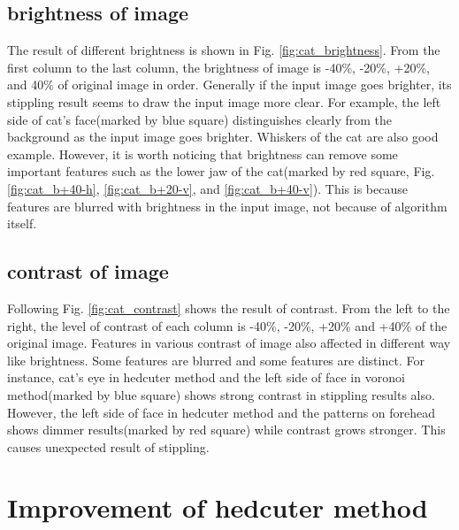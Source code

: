 \documentclass[11pt]{article}
\begin{document}
\subsection{brightness of image}
The result of different brightness is shown in Fig. \ref{fig:cat_brightness}. From the first column to the last column, the brightness of image is -40\%, -20\%, +20\%, and 40\% of original image in order. Generally if the input image goes brighter, its stippling result seems to draw the input image more clear. For example, the left side of cat's face(marked by blue square) distinguishes clearly from the background as the input image goes brighter. Whiskers of the cat are also good example. However, it is worth noticing that brightness can remove some important features such as the lower jaw of the cat(marked by red square, Fig. \ref{fig:cat_b+40-h}, \ref{fig:cat_b+20-v}, and \ref{fig:cat_b+40-v}). This is because features are blurred with brightness in the input image, not because of algorithm itself.
\subsection{contrast of image}
Following Fig. \ref{fig:cat_contrast} shows the result of contrast. From the left to the right, the level of contrast of each column is -40\%, -20\%, +20\% and +40\% of the original image. Features in various contrast of image also affected in different way like brightness. Some features are blurred and some features are distinct. For instance, cat's eye in hedcuter method and the left side of face in voronoi method(marked by blue square) shows strong contrast in stippling results also. However, the left side of face in hedcuter method and the patterns on forehead shows dimmer results(marked by red square) while contrast grows stronger. This causes unexpected result of stippling.
\section{Improvement of hedcuter method}
\end{document}

